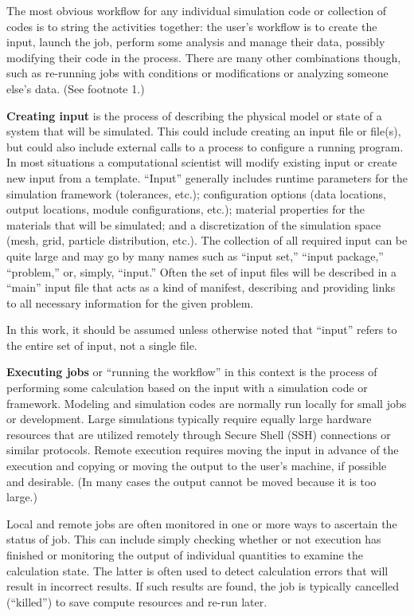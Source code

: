 The most obvious workflow for any individual simulation code or
collection of codes is to string the activities together: the user's
workflow is to create the input, launch the job, perform some analysis
and manage their data, possibly modifying their code in the process.
There are many other combinations though, such as re-running jobs with
conditions or modifications or analyzing someone else's data. (See
footnote 1.)

\textbf{Creating input} is the process of describing the physical model
or state of a system that will be simulated. This could include creating
an input file or file(s), but could also include external calls to a
process to configure a running program. In most situations a
computational scientist will modify existing input or create new input
from a template. ``Input'' generally includes runtime parameters for the
simulation framework (tolerances, etc.); configuration options (data
locations, output locations, module configurations, etc.); material
properties for the materials that will be simulated; and a
discretization of the simulation space (mesh, grid, particle
distribution, etc.). The collection of all required input can be quite
large and may go by many names such as ``input set,'' ``input package,''
``problem,'' or, simply, ``input.'' Often the set of input files will be
described in a ``main'' input file that acts as a kind of manifest,
describing and providing links to all necessary information for the
given problem.

In this work, it should be assumed unless otherwise noted that ``input''
refers to the entire set of input, not a single file.

\textbf{Executing jobs} or ``running the workflow'' in this context is
the process of performing some calculation based on the input with a
simulation code or framework. Modeling and simulation codes are normally
run locally for small jobs or development. Large simulations typically
require equally large hardware resources that are utilized remotely
through Secure Shell (SSH) connections or similar protocols. Remote
execution requires moving the input in advance of the execution and
copying or moving the output to the user's machine, if possible and
desirable. (In many cases the output cannot be moved because it is too
large.)

Local and remote jobs are often monitored in one or more ways to
ascertain the status of job. This can include simply checking whether or
not execution has finished or monitoring the output of individual
quantities to examine the calculation state. The latter is often used to
detect calculation errors that will result in incorrect results. If such
results are found, the job is typically cancelled (``killed'') to save
compute resources and re-run later.

